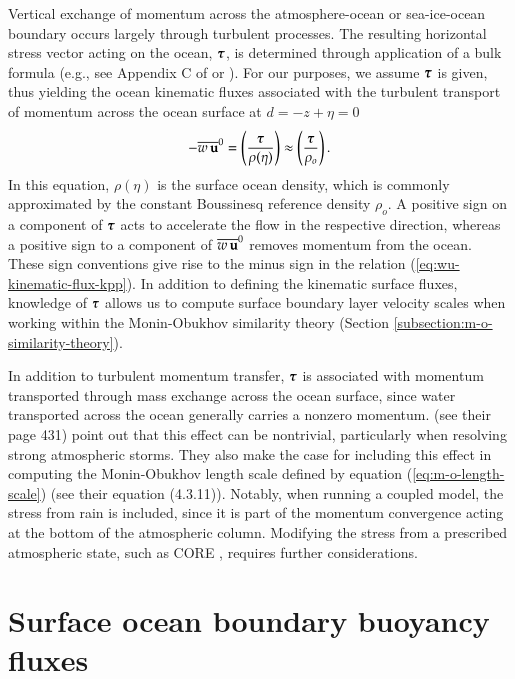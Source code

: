 Vertical exchange of momentum across the atmosphere-ocean or
sea-ice-ocean boundary occurs largely through turbulent processes.
The resulting horizontal stress vector acting on the ocean, $\mbox{\boldmath $\tau$}$,
is determined through application of a bulk formula (e.g., see
Appendix C of \cite{CORE_NYF} or \cite{LargeYeager2009}). For our
purposes, we assume $\mbox{\boldmath $\tau$}$ is given, thus yielding the ocean
kinematic fluxes associated with the turbulent transport of momentum
across the ocean surface at $d = -z + \eta = 0$
\begin{equation}
 -\overline{w \, {\bf u}}^{0} 
 = \left( \frac{ \mbox{\boldmath $\tau$} }{\rho(\eta)} \right) \approx \left( \frac{ \mbox{\boldmath $\tau$} }{\rho_{o}} \right).
\label{eq:wu-kinematic-flux-kpp}
\end{equation} 
In this equation, $\rho(\eta)$ is the surface ocean density, which is
commonly approximated by the constant Boussinesq reference density
$\rho_{o}$.  A positive sign on a component of $\mbox{\boldmath $\tau$}$ acts to
accelerate the flow in the respective direction, whereas a positive
sign to a component of $\overline{w \, {\bf u}}^{0}$ removes
momentum from the ocean.  These sign conventions give rise to the
minus sign in the relation (\ref{eq:wu-kinematic-flux-kpp}). In
addition to defining the kinematic surface fluxes, knowledge of
$\mbox{\boldmath $\tau$}$ allows us to compute surface boundary layer velocity scales
when working within the Monin-Obukhov similarity theory (Section
\ref{subsection:m-o-similarity-theory}).

In addition to turbulent momentum transfer, $\mbox{\boldmath $\tau$}$ is associated
with momentum transported through mass exchange across the ocean
surface, since water transported across the ocean generally carries a
nonzero momentum.  \cite{KanthaClaysonII} (see their page 431) point
out that this effect can be nontrivial, particularly when resolving
strong atmospheric storms. They also make the case for including this
effect in computing the Monin-Obukhov length scale defined by equation
(\ref{eq:m-o-length-scale}) (see their equation (4.3.11)).  Notably,
when running a coupled model, the stress from rain is included, since
it is part of the momentum convergence acting at the bottom of the
atmospheric column.  Modifying the stress from a prescribed
atmospheric state, such as CORE \citep{LargeYeager2009}, requires
further considerations.


\section{Surface ocean boundary buoyancy fluxes}
\label{section:boundary-forcing-buoyancy-kpp}

